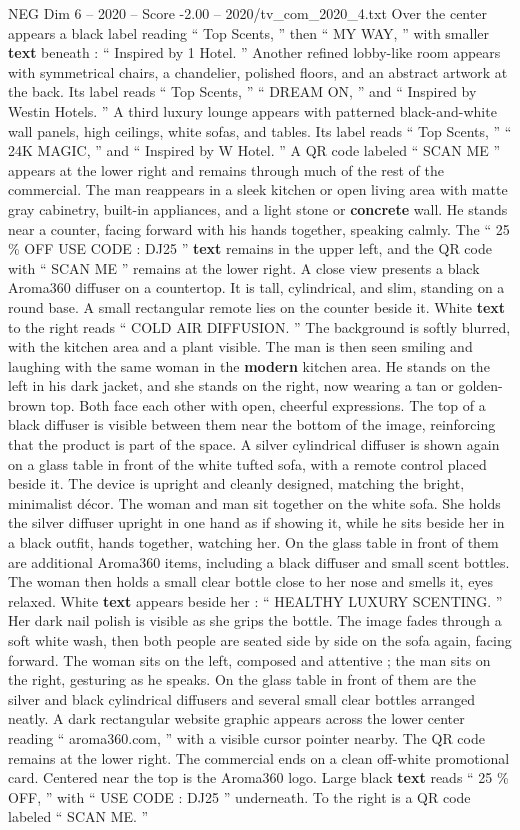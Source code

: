 \begin{textsample}{NEG Dim 6 – 2020 – Score -2.00 – 2020/tv\_com\_2020\_4.txt}
Over the center appears a black label reading “ Top Scents, ” then “ MY WAY, ” with smaller \textbf{text} beneath : “ Inspired by 1 Hotel. ” Another refined lobby-like room appears with symmetrical chairs, a chandelier, polished floors, and an abstract artwork at the back.
Its label reads “ Top Scents, ” “ DREAM ON, ” and “ Inspired by Westin Hotels. ” A third luxury lounge appears with patterned black-and-white wall panels, high ceilings, white sofas, and tables.
Its label reads “ Top Scents, ” “ 24K MAGIC, ” and “ Inspired by W Hotel. ” A QR code labeled “ SCAN ME ” appears at the lower right and remains through much of the rest of the commercial.
The man reappears in a sleek kitchen or open living area with matte gray cabinetry, built-in appliances, and a light stone or \textbf{concrete} wall.
He stands near a counter, facing forward with his hands together, speaking calmly.
The “ 25 \% OFF USE CODE : DJ25 ” \textbf{text} remains in the upper left, and the QR code with “ SCAN ME ” remains at the lower right.
A close view presents a black Aroma360 diffuser on a countertop.
It is tall, cylindrical, and slim, standing on a round base.
A small rectangular remote lies on the counter beside it.
White \textbf{text} to the right reads “ COLD AIR DIFFUSION. ” The background is softly blurred, with the kitchen area and a plant visible.
The man is then seen smiling and laughing with the same woman in the \textbf{modern} kitchen area.
He stands on the left in his dark jacket, and she stands on the right, now wearing a tan or golden-brown top.
Both face each other with open, cheerful expressions.
The top of a black diffuser is visible between them near the bottom of the image, reinforcing that the product is part of the space.
A silver cylindrical diffuser is shown again on a glass table in front of the white tufted sofa, with a remote control placed beside it.
The device is upright and cleanly designed, matching the bright, minimalist décor.
The woman and man sit together on the white sofa.
She holds the silver diffuser upright in one hand as if showing it, while he sits beside her in a black outfit, hands together, watching her.
On the glass table in front of them are additional Aroma360 items, including a black diffuser and small scent bottles.
The woman then holds a small clear bottle close to her nose and smells it, eyes relaxed.
White \textbf{text} appears beside her : “ HEALTHY LUXURY SCENTING. ” Her dark nail polish is visible as she grips the bottle.
The image fades through a soft white wash, then both people are seated side by side on the sofa again, facing forward.
The woman sits on the left, composed and attentive ; the man sits on the right, gesturing as he speaks.
On the glass table in front of them are the silver and black cylindrical diffusers and several small clear bottles arranged neatly.
A dark rectangular website graphic appears across the lower center reading “ aroma360.com, ” with a visible cursor pointer nearby.
The QR code remains at the lower right.
The commercial ends on a clean off-white promotional card.
Centered near the top is the Aroma360 logo.
Large black \textbf{text} reads “ 25 \% OFF, ” with “ USE CODE : DJ25 ” underneath.
To the right is a QR code labeled “ SCAN ME. ”

\end{textsample}

